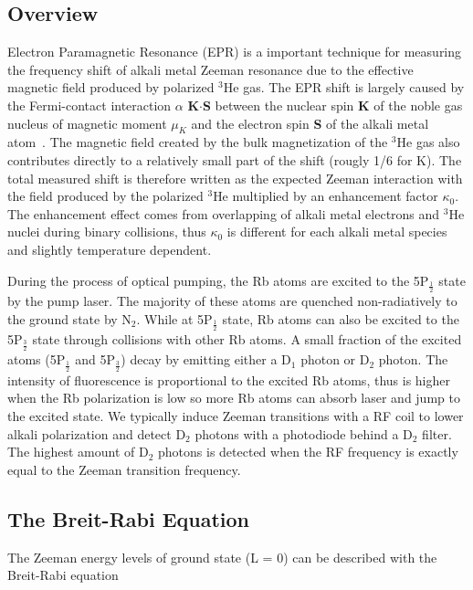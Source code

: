 \subsection{Overview}

Electron Paramagnetic Resonance (EPR) is a important technique for measuring the frequency shift of alkali metal Zeeman resonance due to the effective magnetic field produced by polarized $^{3}$He gas. The EPR shift is largely caused by the Fermi-contact interaction $\alpha$ {\bf K$\cdot$S} between the nuclear spin {\bf K} of the noble gas nucleus of magnetic moment $\mu_{K}$ and the electron spin {\bf S} of the alkali metal atom~\cite{PhysRevA.71.013414}. The magnetic field created by the bulk magnetization of the $^{3}$He gas also contributes directly to a relatively small part of the shift (rougly 1/6 for K). The total measured shift is therefore written as the expected Zeeman interaction with the field produced by the polarized $^{3}$He multiplied by an enhancement factor $\kappa_{0}$. The enhancement effect comes from overlapping of alkali metal electrons and $^{3}$He nuclei during binary collisions, thus $\kappa_{0}$ is different for each alkali metal species and slightly temperature dependent.

During the process of optical pumping, the Rb atoms are excited to the 5P$_{\frac{1}{2}}$ state by the pump laser. The majority of these atoms are quenched non-radiatively to the ground state by N$_{2}$. While at 5P$_{\frac{1}{2}}$ state, Rb atoms can also be excited to the 5P$_{\frac{3}{2}}$ state through collisions with other Rb atoms. A small fraction of the excited atoms (5P$_{\frac{1}{2}}$ and 5P$_{\frac{3}{2}}$) decay by emitting either a D$_{1}$ photon or D$_{2}$ photon. The intensity of fluorescence is proportional to the excited Rb atoms, thus is higher when the Rb polarization is low so more Rb atoms can absorb laser and jump to the excited state. We typically induce Zeeman transitions with a RF coil to lower alkali polarization and detect D$_{2}$ photons with a photodiode behind a D$_{2}$ filter. The highest amount of D$_{2}$ photons is detected when the RF frequency is exactly equal to the Zeeman transition frequency.

\subsection{The Breit-Rabi Equation}

The Zeeman energy levels of ground state (L = 0) can be described with the Breit-Rabi equation

